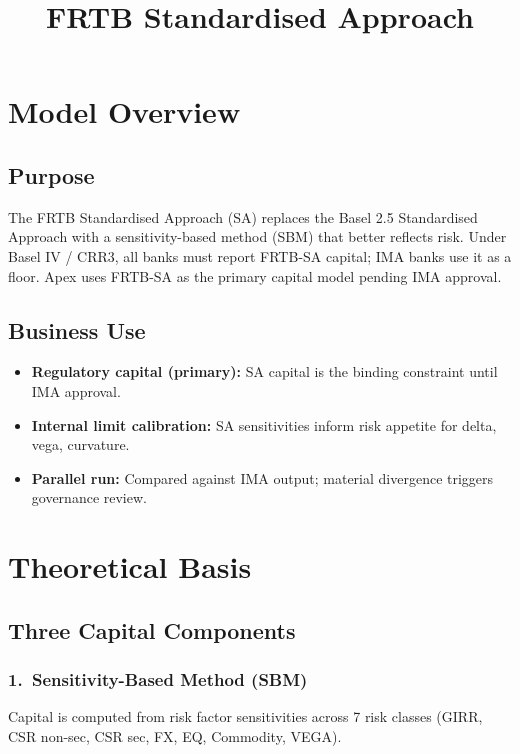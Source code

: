 \documentclass{apex_mdd}
\title{FRTB Standardised Approach}
\begin{document}
\maketitle
\statusbadge

\tableofcontents
\newpage

\section{Model Overview}

\subsection{Purpose}
The FRTB Standardised Approach (SA) replaces the Basel 2.5 Standardised Approach with a sensitivity-based method (SBM) that better reflects risk. Under Basel IV / CRR3, all banks must report FRTB-SA capital; IMA banks use it as a floor. Apex uses FRTB-SA as the primary capital model pending IMA approval.

\subsection{Business Use}
\begin{itemize}
  \item \textbf{Regulatory capital (primary):} SA capital is the binding constraint until IMA approval.
  \item \textbf{Internal limit calibration:} SA sensitivities inform risk appetite for delta, vega, curvature.
  \item \textbf{Parallel run:} Compared against IMA output; material divergence triggers governance review.
\end{itemize}

\section{Theoretical Basis}

\subsection{Three Capital Components}

\subsubsection{1.\ Sensitivity-Based Method (SBM)}
Capital is computed from risk factor sensitivities across 7 risk classes (GIRR, CSR non-sec, CSR sec, FX, EQ, Commodity, VEGA).
\end{document}
